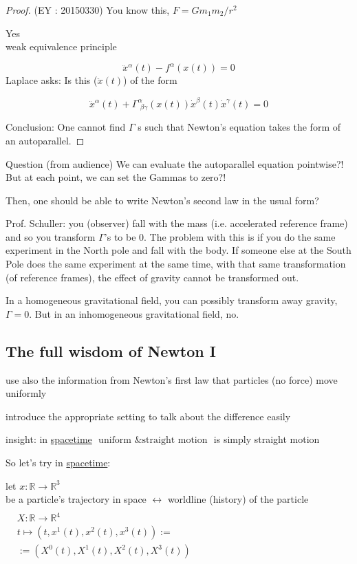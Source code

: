 \documentclass[10pt]{amsart}
\begin{document}
\begin{multicols*}{2}
\begin{proof}
		(EY : 20150330) You know this, $F=Gm_1m_2/r^2$
		
		Yes \\ 
		weak equivalence principle
		
		\[
		\ddot{x}^{\alpha}(t) - f^{\alpha}(x(t)) = 0 
		\]
		Laplace asks: Is this ($\ddot{x}(t)$) of the form 
		
		\[
		\ddot{x}^{\alpha}(t) + \Gamma^{\alpha}_{\, \, \beta \gamma}(x(t)) \dot{x}^{\beta}(t) \dot{x}^{\gamma}(t) = 0 
		\]
		
		Conclusion: One cannot find $\Gamma$ s such that Newton's equation takes the form of an autoparallel.
		
	\end{proof}
	
	Question (from audience) We can evaluate the autoparallel equation pointwise?! But at each point, we can set the Gammas to zero?!
	
	Then, one should be able to write Newton's second law in the usual form?
	
	Prof. Schuller: you (observer) fall with the mass (i.e. accelerated reference frame) and so you transform $\Gamma$'s to be $0$.  The problem with this is if you do the same experiment in the North pole and fall with the body.  If someone else at the South Pole does the same experiment at the same time, with that same transformation (of reference frames), the effect of gravity cannot be transformed out.
	
	In a homogeneous gravitational field, you can possibly transform away gravity, $\Gamma=0$.  But in an inhomogeneous gravitational field, no.
	
	\subsection{The full wisdom of Newton I}
	
	use also the information from Newton's first law that particles (no force) move uniformly 
	
	introduce the appropriate setting to talk about the difference easily
	
	insight: in \underline{spacetime} $\boxed{ \text{ uniform \& straight motion }}$ is simply straight motion
	
	So let's try in \underline{spacetime}: 
	
	let $x: \mathbb{R} \to \mathbb{R}^3$ \\
	\phantom{\quad } be a particle's trajectory in space $\longleftrightarrow $ worldline (history) of the particle $\begin{aligned} & \quad \\
	& X : \mathbb{R} \to \mathbb{R}^4  \\
	& t\mapsto (t, x^1(t), x^2(t),x^3(t)) := \\
	& := (X^0(t), X^1(t),X^2(t),X^3(t)) \end{aligned}$
	

\end{multicols*}
\end{document}
